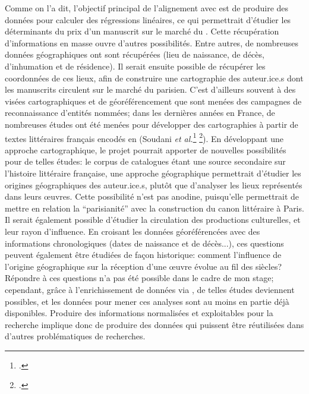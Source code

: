 Comme on l'a dit, l'objectif principal de l'alignement avec \wkd{} est de produire des données pour calculer des régressions linéaires, ce qui permettrait d'étudier les déterminants du prix d'un manuscrit sur le marché du . Cette récupération d'informations en masse ouvre d'autres possibilités. Entre autres, de nombreuses données géographiques ont sont récupérées (lieu de naissance, de décès, d'inhumation et de résidence). Il serait ensuite possible  de récupérer les coordonnées de ces lieux, afin de construire une cartographie des auteur.ice.s dont les manuscrits circulent sur le marché du  parisien. C'est d'ailleurs souvent à des visées cartographiques et de géoréférencement que sont menées des campagnes de reconnaissance d'entités nommées; dans les dernières années en France, de nombreuses études ont été menées pour développer des cartographies à partir de textes littéraires français encodés en \tei{} (Soudani \textit{et al.}\footcite[p.4-5]{soudani_adaptation_2018}\up{,} \footcite[p. 63-66]{frontini_annotation_2016}). En développant une approche cartographique, le projet \mssktb{} pourrait apporter de nouvelles possibilités pour de telles études: le corpus de catalogues étant une source secondaire sur l'histoire littéraire française, une approche géographique permettrait d'étudier les origines géographiques des auteur.ice.s, plutôt que d'analyser les lieux représentés dans leurs œuvres. Cette possibilité n'est pas anodine, puisqu'elle permettrait de mettre en relation la \enquote{parisianité} avec la construction du canon littéraire à Paris. Il serait également possible d'étudier la circulation des productions culturelles, et leur rayon d'influence. En croisant les données géoréférencées avec des informations chronologiques (dates de naissance et de décès...), ces questions peuvent également être étudiées de façon historique: comment l'influence de l'origine géographique sur la réception d'une œuvre évolue au fil des siècles? Répondre à ces questions n'a pas été possible dans le cadre de mon stage; cependant, grâce à l'enrichissement de données via \sparql{}, de telles études deviennent possibles, et les données pour mener ces analyses sont au moins en partie déjà disponibles. Produire des informations normalisées et exploitables pour la recherche implique donc de produire des données qui puissent être réutilisées dans d'autres problématiques de recherches.

